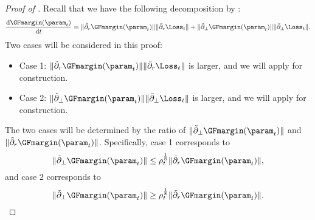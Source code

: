 \begin{proof}
[Proof of ]

Recall that we have the following decomposition by : 
\[
\frac{\mathrm{d} \GFmargin(\param_t)}{ \mathrm{d} t} = \| \tilde  \partial_r \GFmargin(\param_t) \| \| \bar \partial_r \Loss_t\| + \| \tilde \partial_\perp \GFmargin(\param_t) \| \| \bar \partial_\perp \Loss_t\|.
\]
Two cases will be considered in this proof: 
\begin{itemize}
    \item Case 1: $\| \tilde  \partial_r \GFmargin(\param_t) \| \| \bar \partial_r \Loss_t\|$ is larger, and we will apply  for construction. 
    \item Case 2: $\| \tilde \partial_\perp \GFmargin(\param_t) \| \| \bar \partial_\perp \Loss_t\|$ is larger, and we will apply  for construction.
\end{itemize}
The two cases will be determined by the ratio of $\| \tilde \partial_\perp \GFmargin(\param_t) \|$ and $\| \tilde \partial_r \GFmargin(\param_t) \|$. Specifically, case 1 corresponds to
\begin{equation}
\label{eq: case1}
    \| \tilde \partial_\perp \GFmargin(\param_t) \| \le \rho_t^{\frac{1}{8}} \| \tilde \partial_r \GFmargin(\param_t) \|, 
\end{equation}
and case 2 corresponds to
\begin{equation}
\label{eq: case2}
\| \tilde \partial_\perp \GFmargin(\param_t) \| \ge  \rho_t^{\frac{1}{8}} \| \tilde \partial_r \GFmargin(\param_t) \|. 
\end{equation}


\end{proof}
